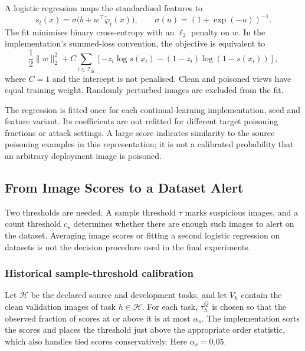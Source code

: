 A logistic regression maps the standardised features to
\begin{equation}
    s_t(x)=\sigma\bigl(b+w^\top\widetilde{\varphi}_t(x)\bigr),
    \qquad \sigma(u)=(1+\exp(-u))^{-1}.
    \label{eq:methods-logistic-score}
\end{equation}
The fit minimises binary cross-entropy with an $\ell_2$ penalty on $w$.
In the implementation's summed-loss convention, the objective is equivalent
to
\begin{equation}
    \frac{1}{2}\|w\|_2^2+
    C\sum_{i\in\mathcal{I}_{\mathrm{fit}}}
    \left[-z_i\log s(x_i)-(1-z_i)\log(1-s(x_i))\right],
    \label{eq:methods-logistic-objective}
\end{equation}
where $C=1$ and the intercept is not penalised. Clean and poisoned views have
equal training weight. Randomly perturbed images are excluded from the fit.

The regression is fitted once for each continual-learning implementation,
seed and feature variant. Its coefficients are not refitted for different
target poisoning fractions or attack settings. A large score indicates
similarity to the source poisoning examples in this representation; it is
not a calibrated probability that an arbitrary deployment image is
poisoned.

\subsection{From Image Scores to a Dataset Alert}
\label{subsec:methods-thresholds}

Two thresholds are needed. A sample threshold $\tau$ marks suspicious
images, and a count threshold $c_\star$ determines whether there are enough
such images to alert on the dataset. Averaging image scores or fitting a
second logistic regression on datasets is not the decision procedure used
in the final experiments.

\subsubsection{Historical sample-threshold calibration}

Let $\mathcal{H}$ be the declared source and development tasks, and let
$V_h$ contain the clean validation images of task $h\in\mathcal{H}$.
For each task, $\tau_h^{Q}$ is chosen so that the observed fraction of
scores at or above it is at most $\alpha_s$. The implementation sorts the
scores and places the threshold just above the appropriate order statistic,
which also handles tied scores conservatively. Here $\alpha_s=0.05$.

